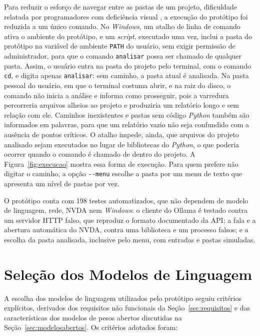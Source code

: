 \documentclass[
    12pt,                   %
    openright,              %
    oneside,                %
    a4paper,                %
    sumario=tradicional,    %
    english,                %
    brazil,                 %
    ]{abntex2}
\begin{document}
Para reduzir o esforço de navegar entre as pastas de um projeto, dificuldade relatada por programadores com deficiência visual \cite{latinoware20457}, a execução do protótipo foi reduzida a um único comando. No \textit{Windows}, um atalho de linha de comando ativa o ambiente do protótipo, e um \textit{script}, executado uma vez, inclui a pasta do protótipo na variável de ambiente \texttt{PATH} do usuário, sem exigir permissão de administrador, para que o comando \texttt{analisar} possa ser chamado de qualquer pasta. Assim, o usuário entra na pasta do projeto pelo terminal, com o comando \texttt{cd}, e digita apenas \texttt{analisar}: sem caminho, a pasta atual é analisada. Na pasta pessoal do usuário, em que o terminal costuma abrir, e na raiz do disco, o comando não inicia a análise e informa como prosseguir, pois a varredura percorreria arquivos alheios ao projeto e produziria um relatório longo e sem relação com ele. Caminhos inexistentes e pastas sem código \textit{Python} também são informados em palavras, para que um relatório vazio não seja confundido com a ausência de pontos críticos. O atalho impede, ainda, que arquivos do projeto analisado sejam executados no lugar de bibliotecas do \textit{Python}, o que poderia ocorrer quando o comando é chamado de dentro do projeto. A Figura~\ref{fig:execucao} mostra essa forma de execução. Para quem prefere não digitar o caminho, a opção \texttt{-{}-menu} escolhe a pasta por um menu de texto que apresenta um nível de pastas por vez.

O protótipo conta com 198 testes automatizados, que não dependem de modelo de linguagem, rede, NVDA nem \textit{Windows}: o cliente do Ollama é testado contra um servidor HTTP falso, que reproduz o formato documentado da API; a fala e a abertura automática do NVDA, contra uma biblioteca e um processo falsos; e a escolha da pasta analisada, inclusive pelo menu, com entradas e pastas simuladas.

\section{Seleção dos Modelos de Linguagem}\label{sec:modelos}

A escolha dos modelos de linguagem utilizados pelo protótipo seguiu critérios explícitos, derivados dos requisitos não funcionais da Seção~\ref{sec:requisitos} e das características dos modelos de pesos abertos discutidas na Seção~\ref{sec:modelosabertos}. Os critérios adotados foram:
\end{document}
